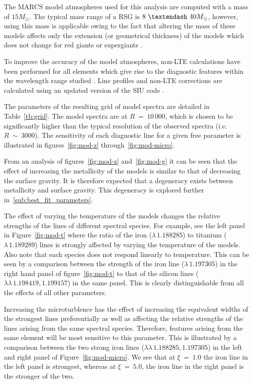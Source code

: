 The MARCS model atmospheres used for this analysis are computed with a mass of $15M_{\odot}$.
The typical mass range of a RSG is $8~\textendash~40M_{\odot}$, however,
using this mass is applicable owing to the fact that altering the mass of these models affects only the extension
(or geometrical thickness) of the models which does not change for red giants or supergiants
\citep{2010MNRAS.407.1203D}.

To improve the accuracy of the model atmospheres,
non-LTE calculations have been performed for all elements which give rise to the diagnostic features within the wavelength range studied
\citep{2012ApJ...751..156B,2013ApJ...764..115B,2014arXiv1412.6527B}.
Line profiles and non-LTE corrections are calculated using an updated version of the SIU code
\citep{1999PhDT.........3R,2012ApJ...751..156B}.

The parameters of the resulting grid of model spectra are detailed in
Table~\ref{tb:grid}.
The model spectra are at $R~=~10\,000$,
which is chosen to be significantly higher than the typical resolution of the observed spectra
(i.e. $R~\sim~3000$).
The sensitivity of each diagnostic line for a given free parameter is illustrated in figures~\ref{fig:mod-z} through~\ref{fig:mod-micro}.

From an analysis of figures~\ref{fig:mod-z} and~\ref{fig:mod-g} it can be seen that the effect of increasing the metallicity of the models is similar to that of decreasing the surface gravity.
It is therefore expected that a degeneracy exists between metallicity and surface gravity.
This degeneracy is explored further in~\ref{sub:best_fit_parameters}.

The effect of varying the temperature of the models changes the relative strengths of the lines of different spectral species.
For example, see the left panel in Figure~\ref{fig:mod-t} where the ratio of the iron
($\lambda\,1.188285$) to titanium ($\lambda\,1.189289$) lines is strongly affected by varying the temperature of the models.
Also note that each species does not respond linearly to temperature.
This can be seen by a comparison between the strength of the iron line
($\lambda\,1.197305$) in the right hand panel of figure~\ref{fig:mod-t} to that of the silicon lines
($\lambda\lambda\,1.198419, 1.199157$) in the same panel.
This is clearly distinguishable from all the effects of all other parameters.


Increasing the microturblence has the effect of increasing the equivalent widths
of the strongest lines preferentially as well as affecting the relative strengths of the lines arising from the same spectral species.
Therefore, features arising from the same element will be most sensitive to this
parameter.
This is illustrated by a comparison between the two strong iron lines
($\lambda\lambda\,1.188285, 1.197305$) in the left and
right panel of Figure~\ref{fig:mod-micro}.
We see that at $\xi~=~1.0$ the iron line in the left panel is strongest,
whereas at $\xi~=~5.0$, the iron line in the right panel is the stronger of the two.


